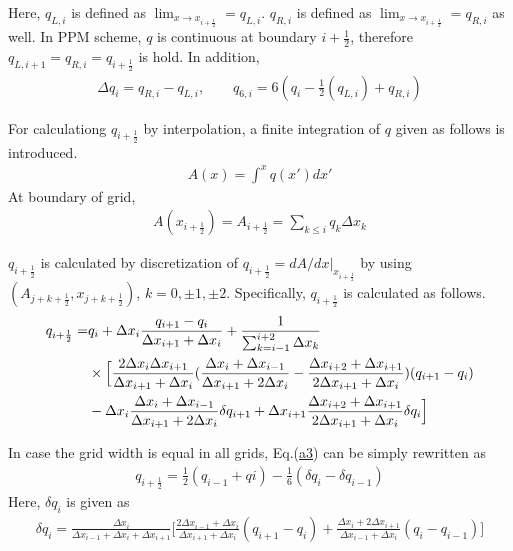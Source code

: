Here, \(q_{L,i}\) is defined as \(\lim_{x \to x_{i+\frac{1}{2}}}=q_{L,i}\). \(q_{R,i}\) is defined as \(\lim_{x \to x_{i+\frac{1}{2}}}=q_{R,i}\) as well. In PPM scheme, \(q\) is continuous at boundary
\(i+\frac{1}{2}\), therefore \(q_{L,i+1}=q_{R,i}=q_{i+\frac{1}{2}}\) is hold. In addition, \begin{eqnarray}\Delta q_{i}=q_{R,i}-q_{L,i},\qquad q_{6,i}=6(q_{i}-\frac{1}{2}(q_{L,i})+q_{R,i})\end{eqnarray}

For calculationg \(q_{i+\frac{1}{2}}\) by interpolation, a finite integration of \(q\) given as follows is introduced. \begin{eqnarray}A(x)= \int^{x} q(x') dx'\end{eqnarray} At boundary of grid,
\begin{eqnarray}A(x_{i+\frac{1}{2}})=A_{i+\frac{1}{2}}=\sum_{k\leq i}q_{k}\Delta x_{k}\end{eqnarray}

\(q_{i+\frac{1}{2}}\) is calculated by discretization of \(q_{i+\frac{1}{2}}=dA/dx |_{x_{i+\frac{1}{2}}}\) by using \((A_{j+k+\frac{1}{2}},x_{j+k+\frac{1}{2}})\), \(k=0,\pm 1, \pm 2\). Specifically,
\(q_{i+\frac{1}{2}}\) is calculated as follows. \begin{eqnarray}\label{a3}
  \begin{aligned}
    q_{i+\frac{1}{2}}=&q_{i}+\Delta x_{i} \frac{q_{i+1}-q_{i}}{\Delta x_{i+1}+\Delta x_{i}}+\frac{1}{\sum_{k=i-1}^{i+2}\Delta x_{k}}\\
    &\times \Bigl[\frac{2\Delta x_{i}\Delta x_{i+1}}{\Delta x_{i+1}+\Delta x_{i}}(\frac{\Delta x_{i}+\Delta x_{i-1}}{\Delta x_{i+1}+2\Delta x_{i}}-\frac{\Delta x_{i+2}+\Delta x_{i+1}}{2\Delta x_{i+1}+\Delta x_{i}})(q_{i+1}-q_{i})\\
     & -\Delta x_{i}\frac{\Delta x_{i}+\Delta x_{i-1}}{\Delta x_{i+1}+2\Delta x_{i}} \delta q_{i+1}+\Delta x_{i+1} \frac{\Delta x_{i+2}+\Delta x_{i+1}}{2\Delta x_{i+1}+\Delta x_{i}} \delta q_{i}\Bigr]
  \end{aligned}\end{eqnarray}

In case the grid width is equal in all grids, Eq.(\url{a3}) can be simply rewritten as \begin{eqnarray}q_{i+\frac{1}{2}}=\frac{1}{2}(q_{i-1}+q{i})-\frac{1}{6}(\delta q_{i}-\delta q_{i-1})\end{eqnarray} Here, \(\delta q_{i}\)
is given as
\begin{eqnarray}\delta q_{i}=\frac{\Delta x_{i}}{\Delta x_{i-1}+\Delta x_{i}+\Delta x_{i+1}}\biggl[\frac{2\Delta x_{i-1}+\Delta x_{i}}{\Delta x_{i+1}+\Delta x_{i}}(q_{i+1}-q_{i})+\frac{\Delta x_{i}+2\Delta x_{i+1}}{\Delta x_{i-1}+\Delta x_{i}}(q_{i}-q_{i-1})\biggr]\end{eqnarray}

